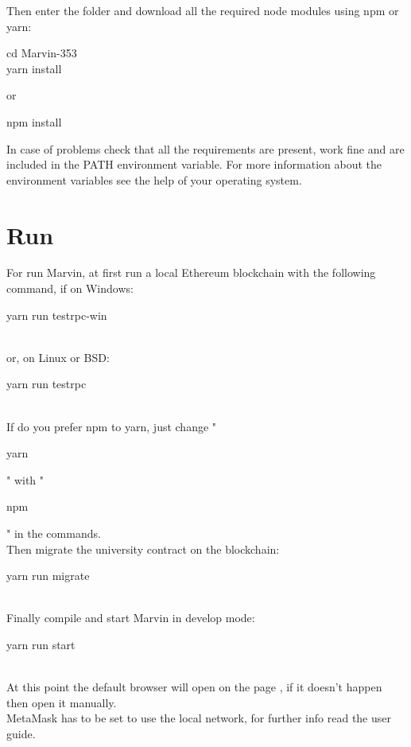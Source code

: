 \documentclass[ManualeSviluppatore]{subfiles}
\begin{document}
Then enter the folder and download all the required node modules using npm or yarn: \\
\begin{ttfamily}
	cd Marvin-353 \\
	yarn install \\
\end{ttfamily}
or \\
\begin{ttfamily}
npm install \\
\end{ttfamily}

In case of problems check that all the requirements are present, work fine and are included in the PATH environment variable. For more information about the environment variables see the help of your operating system. \\


\section{Run}
For run Marvin, at first run a local Ethereum blockchain with the following command, if on Windows: \\
\begin{ttfamily} yarn run testrpc-win \end{ttfamily} \\
or, on Linux or BSD: \\
\begin{ttfamily} yarn run testrpc \end{ttfamily} \\
If do you prefer npm to yarn, just change "\begin{ttfamily}yarn\end{ttfamily}" with "\begin{ttfamily}npm\end{ttfamily}" in the commands.\\

Then migrate the university contract on the blockchain: \\
\begin{ttfamily} yarn run migrate \end{ttfamily} \\
Finally compile and start Marvin in develop mode: \\
\begin{ttfamily} yarn run start \end{ttfamily} \\

At this point the default browser will open on the page , if it doesn't happen then open it manually.\\
MetaMask has to be set to use the local network, for further info read the user guide.
\end{document}
